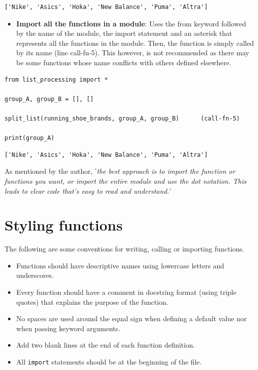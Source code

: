 \documentclass[10pt]{book}
\begin{document}
\label{org7f4355c}
\begin{verbatim}
['Nike', 'Asics', 'Hoka', 'New Balance', 'Puma', 'Altra']
\end{verbatim}

\begin{itemize}
\item \textbf{Import all the functions in a module}: Uses the from keyword followed by the name of the module, the import statement and an asterisk that represents all the functions in the module. Then, the function is simply called by its name (line call-fn-5). This however, is not recommended as there may be some functions whose name conflicts with others defined elsewhere.
\end{itemize}

\label{org0520298}
\begin{verbatim}
from list_processing import *

group_A, group_B = [], []

split_list(running_shoe_brands, group_A, group_B)      (call-fn-5)

print(group_A)
\end{verbatim}

\label{org013f4e6}
\begin{verbatim}
['Nike', 'Asics', 'Hoka', 'New Balance', 'Puma', 'Altra']
\end{verbatim}

As mentioned by the author, '\emph{the best approach is to import the function or functions you want, or import the entire module and use the dot notation. This leads to clear code that’s easy to read and understand.}' \parencite[p. 153]{Matthes-2019}
\section{Styling functions}
\label{sec:org3d9e267}
The following are some conventions for writing, calling or importing functions.
\begin{itemize}
\item Functions should have descriptive names using lowercase letters and underscores.
\item Every function should have a comment in docstring format (using triple quotes) that explains the purpose of the function.
\item No spaces are used around the equal sign when defining a default value nor when passing keyword arguments.
\item Add two blank lines at the end of each function definition.
\item All \texttt{import} statements should be at the beginning of the file.
\end{itemize}
\end{document}
